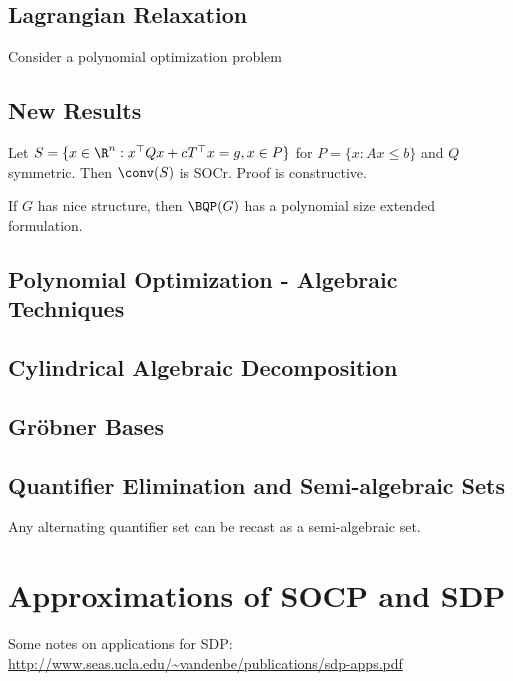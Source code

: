 \section{Lagrangian Relaxation}


Consider a polynomial optimization problem 

\section{New Results}

\begin{theorem}
Let $S = \{x \in \R^n : x^\top Q x + cT^\top x = g, x \in P\}$  for $P = \{x : Ax \leq b\}$ and $Q$ symmetric.  Then $\conv(S)$ is SOCr.  Proof is constructive.
\end{theorem}

\begin{theorem}[Gupte et. al. 2019]
If $G$ has nice structure, then $\BQP(G)$ has a polynomial size extended formulation.
\end{theorem}
\section{Polynomial Optimization - Algebraic Techniques}

\section{Cylindrical Algebraic Decomposition}


\section{Gr\"obner Bases}

\section{Quantifier Elimination and Semi-algebraic Sets}

\begin{theorem}
Any alternating quantifier set can be recast as a semi-algebraic set.
\end{theorem}




\chapter{Approximations of SOCP and SDP}
Some notes on applications for SDP: \url{http://www.seas.ucla.edu/~vandenbe/publications/sdp-apps.pdf}

